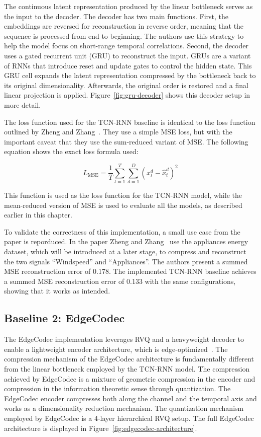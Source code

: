 The continuous latent representation produced by the linear bottleneck serves as the input to the decoder. The decoder has two main functions. First, the embeddings are reversed for reconstruction in reverse order, meaning that the sequence is processed from end to beginning. The authors use this strategy to help the model focus on short-range temporal correlations. Second, the decoder uses a gated recurrent unit (GRU) to reconstruct the input. GRUs are a variant of RNNs that introduce reset and update gates to control the hidden state. This GRU cell expands the latent representation compressed by the bottleneck back to its original dimensionality. Afterwards, the original order is restored and a final linear projection is applied. Figure~\ref{fig:gru-decoder} shows this decoder setup in more detail.

The loss function used for the TCN-RNN baseline is identical to the loss function outlined by Zheng and Zhang~\cite{Zheng2023}. They use a simple MSE loss, but with the important caveat that they use the sum-reduced variant of MSE. The following equation shows the exact loss formula used: 

\begin{equation}
L_{\mathrm{MSE}} = \frac{1}{T} \sum_{t=1}^{T} \sum_{d=1}^{D} \left( x_t^d - \hat{x}_t^d \right)^2
\end{equation}

This function is used as the loss function for the TCN-RNN model, while the mean-reduced version of MSE is used to evaluate all the models, as described earlier in this chapter.

To validate the correctness of this implementation, a small use case from the paper is reporduced. In the paper Zheng and Zhang~\cite{Zheng2023} use the appliances energy dataset, which will be introduced at a later stage, to compress and reconstruct the two signals ``Windspeed'' and ``Appliances''. The authors present a summed MSE reconstruction error of 0.178. The implemented TCN-RNN baseline achieves a summed MSE reconstruction error of 0.133 with the same configurations, showing that it works as intended.  

\subsection{Baseline 2: EdgeCodec}

The EdgeCodec implementation leverages RVQ and a heavyweight decoder to enable a lightweight encoder architecture, which is edge-optimized~\cite{Hodo2025}. The compression mechanism of the EdgeCodec architecture is fundamentally different from the linear bottleneck employed by the TCN-RNN model. The compression achieved by EdgeCodec is a mixture of geometric compression in the encoder and compression in the information theoretic sense through quantization. The EdgeCodec encoder compresses both along the channel and the temporal axis and works as a dimensionality reduction mechanism. The quantization mechanism employed by EdgeCodec is a 4-layer hierarchical RVQ setup. The full EdgeCodec architecture is displayed in Figure~\ref{fig:edgecodec-architecture}. 

